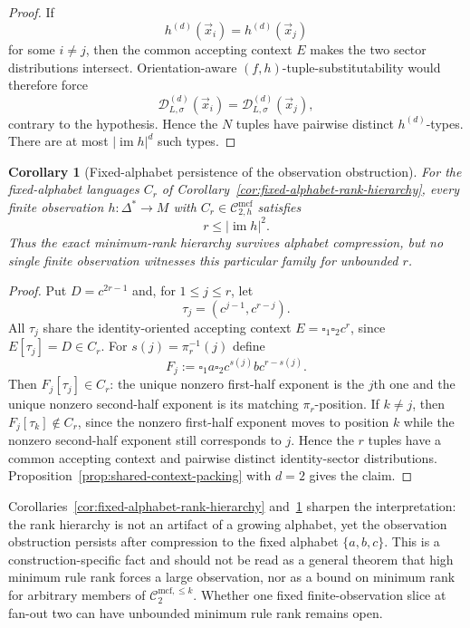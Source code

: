 \documentclass[11pt,a4paper]{article}
\numberwithin{equation}{section}
\theoremstyle{plain}
\newtheorem{corollary}[theorem]{Corollary}
\theoremstyle{definition}
\theoremstyle{remark}
\newcommand{\Cmcf}[2]{\mathcal{C}^{\mathrm{mcf}}_{#1,#2}}
\newcommand{\Clatent}[2]{\mathcal{C}^{\mathrm{mcf},\le #2}_{#1}}
\newcommand{\D}{\mathcal{D}}
\newcommand{\tuple}[1]{\vec{#1}}
\newcommand{\blank}{\square}
\begin{document}
\begin{proof}
If
\[
  h^{(d)}(\tuple x_i)=h^{(d)}(\tuple x_j)
\]
for some $i\ne j$, then the common accepting context $E$ makes the two sector
distributions intersect.  Orientation-aware $(f,h)$-tuple-substitutability
would therefore force
\[
  \D_{L,\sigma}^{(d)}(\tuple x_i)
  =
  \D_{L,\sigma}^{(d)}(\tuple x_j),
\]
contrary to the hypothesis.  Hence the $N$ tuples have pairwise distinct
$h^{(d)}$-types.  There are at most $|\operatorname{im}h|^d$ such types.
\end{proof}




\begin{corollary}[Fixed-alphabet persistence of the observation obstruction]
\label{cor:fixed-alphabet-rank-observation}
For the fixed-alphabet languages $C_r$ of
Corollary~\ref{cor:fixed-alphabet-rank-hierarchy}, every finite observation
$h:\Delta^*\to M$ with $C_r\in\Cmcf{2}{h}$ satisfies
\[
  r\le |\operatorname{im}h|^2.
\]
Thus the exact minimum-rank hierarchy survives alphabet compression, but no
single finite observation witnesses this particular family for unbounded
$r$.
\end{corollary}

\begin{proof}
Put $D=c^{2r-1}$ and, for $1\le j\le r$, let
\[
  \tau_j=(c^{j-1},c^{r-j}).
\]
All $\tau_j$ share the identity-oriented accepting context
$E=\blank_1\blank_2c^r$, since $E[\tau_j]=D\in C_r$.
For $s(j)=\pi_r^{-1}(j)$ define
\[
  F_j:=\blank_1a\blank_2c^{s(j)}bc^{r-s(j)}.
\]
Then $F_j[\tau_j]\in C_r$: the unique nonzero first-half exponent is the
$j$th one and the unique nonzero second-half exponent is its matching
$\pi_r$-position.  If $k\ne j$, then $F_j[\tau_k]\notin C_r$, since the
nonzero first-half exponent moves to position $k$ while the nonzero
second-half exponent still corresponds to $j$.  Hence the $r$ tuples have a
common accepting context and pairwise distinct identity-sector distributions.
Proposition~\ref{prop:shared-context-packing} with $d=2$ gives the claim.
\end{proof}

Corollaries~\ref{cor:fixed-alphabet-rank-hierarchy}
and~\ref{cor:fixed-alphabet-rank-observation} sharpen the interpretation:
the rank hierarchy is not an artifact of a growing alphabet, yet the
observation obstruction persists after compression to the fixed alphabet
$\{a,b,c\}$.  This is a construction-specific fact and should not be read as
a general theorem that high minimum rule rank forces a large observation, nor
as a bound on minimum rank for arbitrary members of $\Clatent{2}{k}$.
Whether one fixed finite-observation slice at fan-out two can have unbounded
minimum rule rank remains open.
\end{document}
